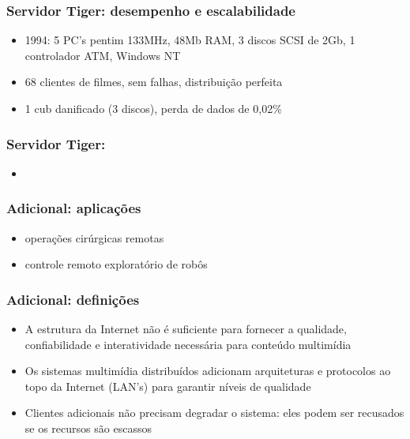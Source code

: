 \documentclass[]{beamer}
\begin{document}
\begin{frame}
 \frametitle{Servidor Tiger: desempenho e escalabilidade}
 \begin{itemize}
  \item 1994: 5 PC's pentim 133MHz, 48Mb RAM, 3 discos SCSI de 2Gb, 1 controlador ATM,
Windows NT
  \item 68 clientes de filmes, sem falhas, distribuição perfeita
  \item 1 cub danificado (3 discos), perda de dados de 0,02\%
 \end{itemize}
\end{frame}

\begin{frame}
 \frametitle{Servidor Tiger: }
 \begin{itemize}
  \item 
 \end{itemize}
\end{frame}

\begin{frame}
 \frametitle{Adicional: aplicações\cite{Maxlow:2003}}
  \begin{itemize}
   \item operações cirúrgicas remotas
   \item controle remoto exploratório de robôs
  \end{itemize}
\end{frame}

\begin{frame}
 \frametitle{Adicional: definições\cite{Maxlow:2003}}
  \begin{itemize}
   \item A estrutura da Internet não é suficiente para fornecer a qualidade, confiabilidade
e interatividade necessária para conteúdo multimídia
   \item Os sistemas multimídia distribuídos adicionam arquiteturas e protocolos
ao topo da Internet (LAN's) para garantir níveis de qualidade
   \item Clientes adicionais não precisam degradar o sistema: eles podem ser recusados se
os recursos são escassos
  \end{itemize}
\end{frame}

\end{document}
